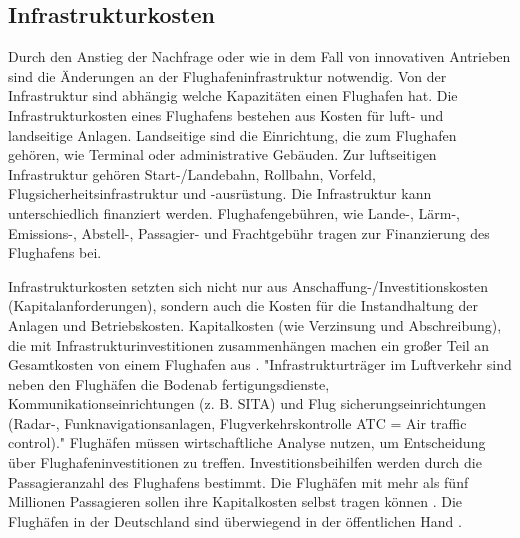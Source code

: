 \subsection{Infrastrukturkosten}
%
Durch den Anstieg der Nachfrage oder wie in dem Fall von innovativen Antrieben sind die Änderungen an der Flughafeninfrastruktur notwendig.
Von der Infrastruktur sind abhängig welche Kapazitäten einen Flughafen hat.
Die Infrastrukturkosten eines Flughafens bestehen aus Kosten für luft- und landseitige Anlagen. Landseitige sind die Einrichtung, die zum Flughafen
gehören, wie Terminal oder administrative Gebäuden. Zur luftseitigen Infrastruktur gehören Start-/Landebahn, Rollbahn, Vorfeld, 
Flugsicherheitsinfrastruktur und -ausrüstung. Die Infrastruktur kann unterschiedlich finanziert werden.
Flughafengebühren, wie Lande-, Lärm-, Emissions-, Abstell-, Passagier- und Frachtgebühr tragen zur Finanzierung des Flughafens bei.%

Infrastrukturkosten setzten sich nicht nur aus Anschaffung-/Investitionskosten (Kapitalanforderungen), sondern auch die Kosten für die Instandhaltung der Anlagen und Betriebskosten.
Kapitalkosten (wie Verzinsung und Abschreibung), die mit Infrastrukturinvestitionen zusammenhängen machen ein großer Teil an Gesamtkosten von einem Flughafen aus \cite{wittmer2011aviation}.
"Infrastrukturträger im Luftverkehr sind neben den Flughäfen die Bodenab
fertigungsdienste, Kommunikationseinrichtungen (z. B. SITA) und Flug
sicherungseinrichtungen (Radar-, Funknavigationsanlagen, Flugverkehrskontrolle 
ATC = Air traffic control)."  %
%
Flughäfen müssen wirtschaftliche Analyse nutzen, um Entscheidung über Flughafeninvestitionen zu treffen. %
Investitionsbeihilfen werden durch die Passagieranzahl des Flughafens bestimmt. Die Flughäfen mit mehr als fünf Millionen Passagieren
sollen ihre Kapitalkosten selbst tragen können \cite{conrady2019luftverkehr}. 
Die Flughäfen in der Deutschland sind überwiegend in der öffentlichen Hand \cite{conrady2019luftverkehr}.

